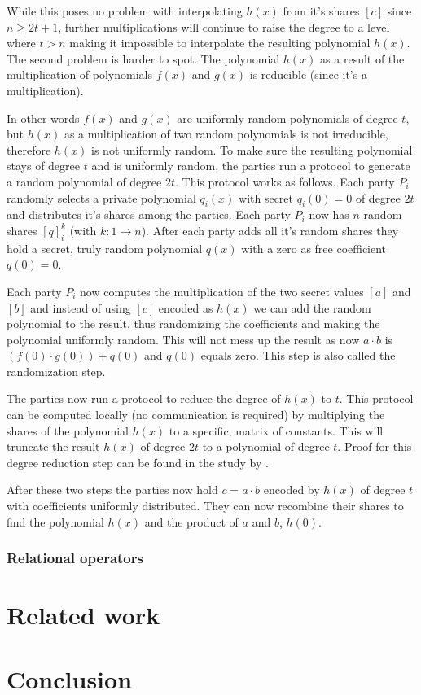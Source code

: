 While this poses no problem with interpolating $h(x)$ from it's shares $[c]$ since $n \geq 2t + 1$, further multiplications will continue to raise the degree to a level where $t>n$ making it impossible to interpolate the resulting polynomial $h(x)$. The second problem is harder to spot.
The polynomial $h(x)$ as a result of the multiplication of polynomials $f(x)$ and $g(x)$ is reducible (since it's a multiplication).

In other words $f(x)$ and $g(x)$ are uniformly random polynomials of degree $t$, but $h(x)$ as a multiplication of two random polynomials is not irreducible, therefore $h(x)$ is not uniformly random. To make sure the resulting polynomial stays of degree $t$ and is uniformly random, the parties run a protocol to generate a random polynomial of degree $2t$.
This protocol works as follows. Each party $P_i$ randomly selects a private polynomial $q_i(x)$ with secret $q_i(0) = 0$ of degree $2t$ and distributes it's shares among the parties. Each party $P_i$ now has $n$ random shares $[q]_i^k$ (with $k: 1 \rightarrow n$). After each party adds all it's random shares they hold a secret, truly random polynomial $q(x)$ with a zero as free coefficient $q(0) = 0$.

Each party $P_i$ now computes the multiplication of the two secret values $[a]$ and $[b]$ and instead of using $[c]$ encoded as $h(x)$ we can add the random polynomial to the result, thus randomizing the coefficients and making the polynomial uniformly random. This will not mess up the result as now $a \cdot b$  is $(f(0) \cdot g(0)) + q(0)$ and $q(0)$ equals zero. This step is also called the randomization step.


The parties now run a protocol to reduce the degree of $h(x)$ to $t$. This protocol can be computed locally (no communication is required) by multiplying the shares of the polynomial $h(x)$ to a specific, matrix of constants. This will truncate the result $h(x)$ of degree $2t$ to a polynomial of degree $t$. Proof for this degree reduction step can be found in the study by \cite{asharov2017full}.


After these two steps the parties now hold $c =a \cdot b$ encoded by $h(x)$ of degree $t$ with coefficients uniformly distributed. They can now recombine their shares to find the polynomial $h(x)$ and the product of $a$ and $b$, $h(0)$.

\subsubsection{Relational operators}

\section{Related work}

\section{Conclusion}
